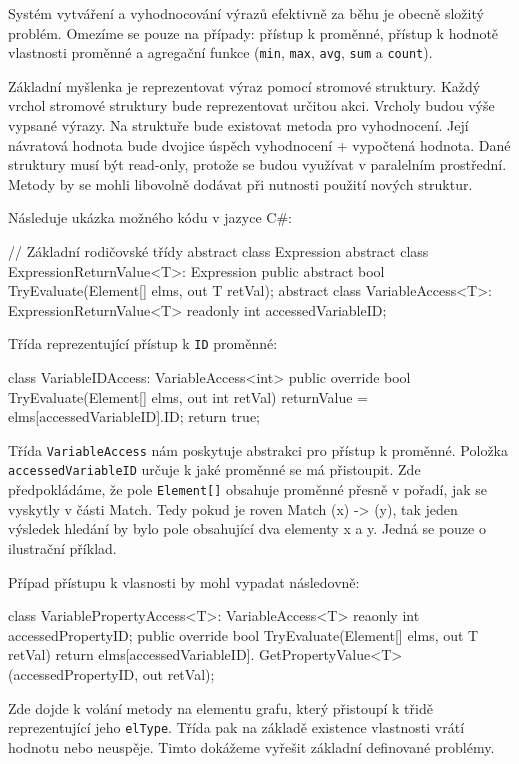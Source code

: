 Systém vytváření a vyhodnocování výrazů efektivně za běhu je obecně složitý problém.
Omezíme se pouze na případy: přístup k proměnné, přístup k hodnotě vlastnosti proměnné a agregační funkce (\verb+min+, \verb+max+, \verb+avg+, \verb+sum+ a \verb+count+).

Základní myšlenka je reprezentovat výraz pomocí stromové struktury. 
Každý vrchol stromové struktury bude reprezentovat určitou akci.
Vrcholy budou výše vypsané výrazy. 
Na struktuře bude existovat metoda pro vyhodnocení.
Její návratová hodnota bude dvojice úspěch vyhodnocení + vypočtená hodnota. 
Dané struktury musí být read-only, protože se budou využívat v paralelním prostřední.
Metody by se mohli libovolně dodávat při nutnosti použití nových struktur. 

Následuje ukázka možného kódu v jazyce C\#:
\begin{code}
// Základní rodičovské třídy
abstract class Expression { }
abstract class ExpressionReturnValue<T>: Expression {
  public abstract bool TryEvaluate(Element[] elms, out T retVal); 
}
abstract class VariableAccess<T>: ExpressionReturnValue<T> {
     readonly int accessedVariableID; }
\end{code}
Třída reprezentující přístup k \verb+ID+ proměnné:
\begin{code}
class VariableIDAccess: VariableAccess<int> {
  public override bool TryEvaluate(Element[] elms, out int retVal) {
     returnValue = elms[accessedVariableID].ID;
     return true; 
  }
}
\end{code}
Třída \verb+VariableAccess+ nám poskytuje abstrakci pro přístup k proměnné.
Položka \verb+accessedVariableID+ určuje k jaké proměnné se má přistoupit.
Zde předpokládáme, že pole \verb+Element[]+ obsahuje proměnné přesně v pořadí, jak se vyskytly v části Match.
Tedy pokud je roven Match (x) -> (y), tak jeden výsledek hledání by bylo pole obsahující dva elementy x a y.
Jedná se pouze o ilustrační příklad. 

Případ přístupu k vlasnosti by mohl vypadat následovně:
\begin{code}
class VariablePropertyAccess<T>: VariableAccess<T> {
  reaonly int accessedPropertyID; 
  public override bool TryEvaluate(Element[] elms, out T retVal) {
    return elms[accessedVariableID].
               GetPropertyValue<T>(accessedPropertyID, out retVal);
  }
}
\end{code}
Zde dojde k volání metody na elementu grafu, který přistoupí k třidě reprezentující jeho \verb+elType+.
Třída pak na základě existence vlastnosti vrátí hodnotu nebo neuspěje.
Timto dokážeme vyřešit základní definované problémy.

